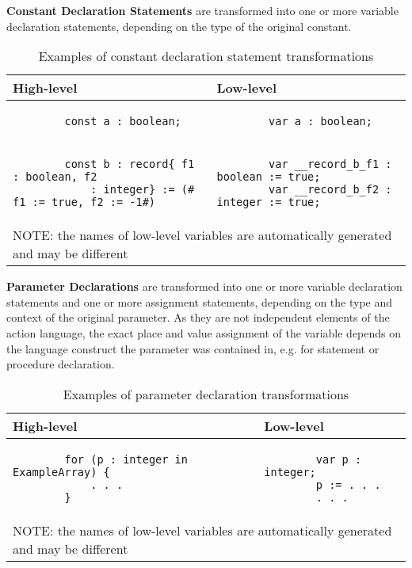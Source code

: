 \bigskip
\textbf{Constant Declaration Statements} are transformed into one or more variable declaration statements, depending on the type of the original constant.

\begin{table}[ht]
	\footnotesize
	\centering
	\begin{tabular}{ p{7cm} p{7cm} }
		\toprule
		High-level & Low-level \\
		\midrule
		\begin{lstlisting}
		const a : boolean;\end{lstlisting} & 
		\begin{lstlisting}
		var a : boolean;\end{lstlisting} \\
		\begin{lstlisting}
		const b : record{ f1 : boolean, f2 
			: integer} := (# f1 := true, f2 := -1#)	
		\end{lstlisting} & 
		\begin{lstlisting}
		var __record_b_f1 : boolean := true;
		var __record_b_f2 : integer := true;
		\end{lstlisting} \\
		\bottomrule
		\multicolumn{2}{l}{NOTE: the names of low-level variables are automatically generated and may be different}
	\end{tabular}
	\caption{Examples of constant declaration statement transformations}
	\label{tab:SCLLConstantDeclarationExample}
\end{table}

\bigskip
\textbf{Parameter Declarations} are transformed into one or more variable declaration statements and one or more assignment statements, depending on the type and context of the original parameter. As they are not independent elements of the action language, the exact place and value assignment of the variable depends on the language construct the parameter was contained in, e.g. for statement or procedure declaration.

\begin{table}[ht]
	\footnotesize
	\centering
	\begin{tabular}{ p{7cm} p{7cm} }
		\toprule
		High-level & Low-level \\
		\midrule
		\begin{lstlisting}
		for (p : integer in ExampleArray) {
			. . .
		}\end{lstlisting} & 
		\begin{lstlisting}
		var p : integer;
		p := . . .
		. . .\end{lstlisting} \\
		\bottomrule
		\multicolumn{2}{l}{NOTE: the names of low-level variables are automatically generated and may be different}
	\end{tabular}
	\caption{Examples of parameter declaration transformations}
	\label{tab:SCLLParameterDeclarationExample}
\end{table}

